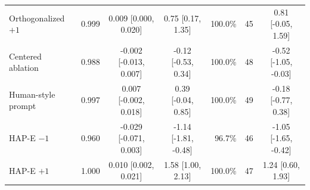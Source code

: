\begin{tabular}{lrccrrc}
Orthogonalized $+1$ & 0.999 & 0.009 [0.000, 0.020] & 0.75 [0.17, 1.35] & 100.0\% & 45 & 0.81 [-0.05, 1.59] \\
Centered ablation & 0.988 & -0.002 [-0.013, 0.007] & -0.12 [-0.53, 0.34] & 100.0\% & 48 & -0.52 [-1.05, -0.03] \\
Human-style prompt & 0.997 & 0.007 [-0.002, 0.018] & 0.39 [-0.04, 0.85] & 100.0\% & 49 & -0.18 [-0.77, 0.38] \\
HAP-E $-1$ & 0.960 & -0.029 [-0.071, 0.003] & -1.14 [-1.81, -0.48] & 96.7\% & 46 & -1.05 [-1.65, -0.42] \\
HAP-E $+1$ & 1.000 & 0.010 [0.002, 0.021] & 1.58 [1.00, 2.13] & 100.0\% & 47 & 1.24 [0.60, 1.93] \\
\bottomrule
\end{tabular}
